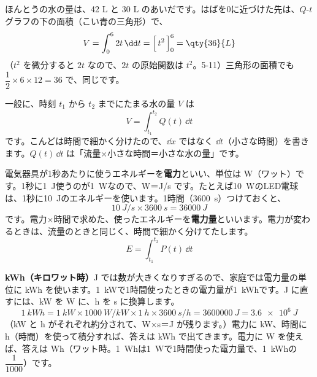 \noindent\begin{minipage}[c]{0.46\linewidth}
\end{minipage}\hfill
\begin{minipage}[c]{0.52\linewidth}\raggedright
ほんとうの水の量は、42 L と 30 L のあいだです。はばを0に近づけた先は、$Q$-$t$ グラフの下の面積（こい青の三角形）で、
\[ V=\int_0^6 2t\,\dd t=\Bigl[\,t^2\,\Bigr]_0^6=\qty{36}{L} \]
（$t^2$ を微分すると $2t$ なので、$2t$ の原始関数は $t^2$。5-11）三角形の面積でも $\dfrac{1}{2}\times6\times12=36$ で、同じです。
\end{minipage}

\noindent 一般に、時刻 $t_1$ から $t_2$ までにたまる水の量 $V$ は
\[ V=\int_{t_1}^{t_2} Q(t)\,\dd t \]
です。こんどは時間で細かく分けたので、$\dd x$ ではなく $\dd t$（小さな時間）を書きます。$Q(t)\,\dd t$ は「流量×小さな時間＝小さな水の量」です。


\label{bk:5-12:denryoku}電気器具が1秒あたりに使うエネルギーを\textbf{電力}といい、単位は W（ワット）です。1秒に\qty{1}{J}使うのが\qty{1}{W}なので、W＝J/s です。たとえば\qty{10}{W}のLED電球は、1秒に\qty{10}{J}のエネルギーを使います。1時間（\qty{3600}{s}）つけておくと、
\[ \qty{10}{J/s}\times\qty{3600}{s}=\qty{36000}{J} \]
です。電力×時間で求めた、使ったエネルギーを\textbf{電力量}といいます。電力が変わるときは、流量のときと同じく、時間で細かく分けてたします。
\[ E=\int_{t_1}^{t_2}P(t)\,\dd t \]

\noindent\textbf{kWh（キロワット時）}\quad J では数が大きくなりすぎるので、家庭では電力量の単位に kWh を使います。\qty{1}{kW}で1時間使ったときの電力量が\qty{1}{kWh}です。J に直すには、kW を W に、h を s に換算します。
\[ \qty{1}{kWh}=\qty{1}{kW}\times\qty{1000}{W/kW}\times\qty{1}{h}\times\qty{3600}{s/h}=\qty{3600000}{J}=\qty{3.6e6}{J} \]
（kW と h がそれぞれ約分されて、W×s＝J が残ります。）電力に kW、時間に h（時間）を使って積分すれば、答えは kWh で出てきます。電力に W を使えば、答えは Wh（ワット時。\qty{1}{Wh}は\qty{1}{W}で1時間使った電力量で、\qty{1}{kWh}の $\dfrac{1}{1000}$）です。

